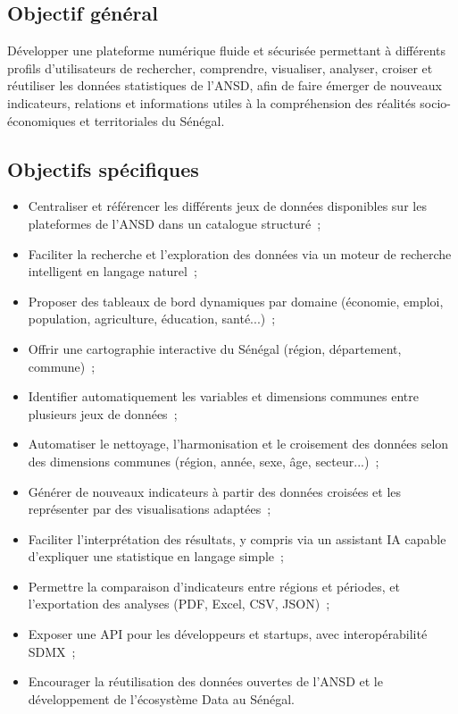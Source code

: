 \documentclass[11pt,a4paper]{article}
\begin{document}
\subsection{Objectif général}

Développer une plateforme numérique fluide et sécurisée permettant à différents profils d'utilisateurs de rechercher, comprendre, visualiser, analyser, croiser et réutiliser les données statistiques de l'ANSD, afin de faire émerger de nouveaux indicateurs, relations et informations utiles à la compréhension des réalités socio-économiques et territoriales du Sénégal.

\subsection{Objectifs spécifiques}

\begin{itemize}
  \item Centraliser et référencer les différents jeux de données disponibles sur les plateformes de l'ANSD dans un catalogue structuré~;
  \item Faciliter la recherche et l'exploration des données via un moteur de recherche intelligent en langage naturel~;
  \item Proposer des tableaux de bord dynamiques par domaine (économie, emploi, population, agriculture, éducation, santé...)~;
  \item Offrir une cartographie interactive du Sénégal (région, département, commune)~;
  \item Identifier automatiquement les variables et dimensions communes entre plusieurs jeux de données~;
  \item Automatiser le nettoyage, l'harmonisation et le croisement des données selon des dimensions communes (région, année, sexe, âge, secteur...)~;
  \item Générer de nouveaux indicateurs à partir des données croisées et les représenter par des visualisations adaptées~;
  \item Faciliter l'interprétation des résultats, y compris via un assistant IA capable d'expliquer une statistique en langage simple~;
  \item Permettre la comparaison d'indicateurs entre régions et périodes, et l'exportation des analyses (PDF, Excel, CSV, JSON)~;
  \item Exposer une API pour les développeurs et startups, avec interopérabilité SDMX~;
  \item Encourager la réutilisation des données ouvertes de l'ANSD et le développement de l'écosystème Data au Sénégal.
\end{itemize}
\end{document}
